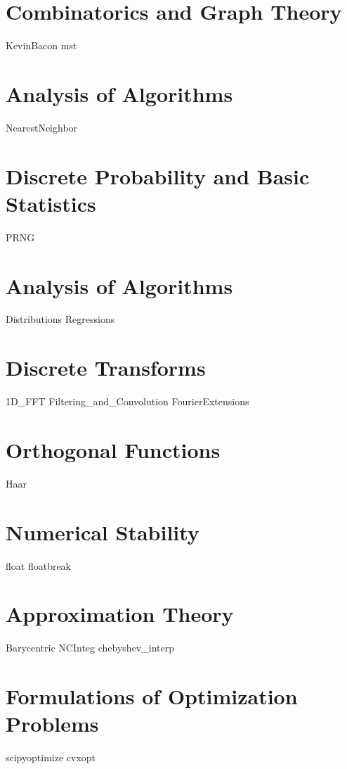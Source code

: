 \documentclass[nociteref]{SIAM-GH-book}
\begin{document}
\part{Combinatorics and Graph Theory}
{KevinBacon}
{mst}

\part{Analysis of Algorithms}
{NearestNeighbor}

\part{Discrete Probability and Basic Statistics}
{PRNG}

\part{Analysis of Algorithms}
{Distributions}
{Regressions}

\part{Discrete Transforms}
{1D_FFT}
{Filtering_and_Convolution}
{FourierExtensions}

\part{Orthogonal Functions}
{Haar}

\part{Numerical Stability}
{float}
{floatbreak}

\part{Approximation Theory}
{Barycentric}
{NCInteg}
{chebyshev_interp}


\part{Formulations of Optimization Problems}
{scipyoptimize}
{cvxopt}
\end{document}
